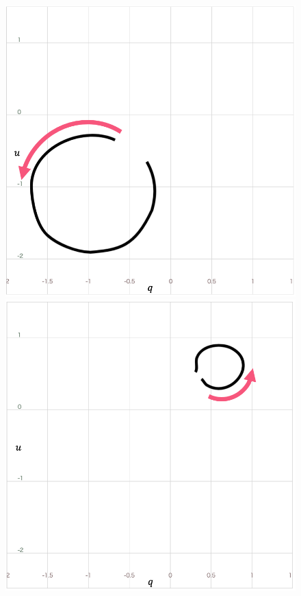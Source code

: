 
\begin{figure}[tb]
    \centering
    \begin{minipage}{0.49\linewidth}
        \centering
        \includegraphics[width=.9\linewidth]{vgtc_journal_latex/figures/QBSSketchwithoutWidth.png}
    \end{minipage}
    \begin{minipage}{0.49\linewidth}
        \centering
        \includegraphics[width=.9\linewidth]{vgtc_journal_latex/figures/QBSResultQuerywithoutWidth.png}

\end{minipage}
\end{figure}
